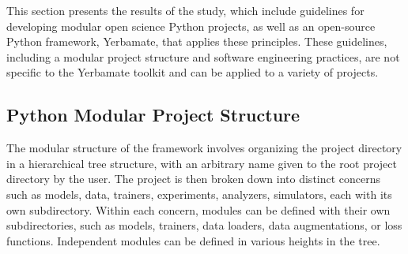 This section presents the results of the study, which include guidelines for developing modular open science Python projects, as well as an open-source Python framework, Yerbamate, that applies these principles. These guidelines, including a modular project structure and software engineering practices, are not specific to the Yerbamate toolkit and can be applied to a variety of projects.


\subsection{Python Modular Project Structure}



 The modular structure of the framework involves organizing the project directory in a hierarchical tree structure, with an arbitrary name given to the root project directory by the user. The project is then broken down into distinct concerns such as models, data, trainers, experiments, analyzers, simulators, each with its own subdirectory. Within each concern, modules can be defined with their own subdirectories, such as models, trainers, data loaders, data augmentations, or loss functions. Independent modules can be defined in various heights in the tree.

